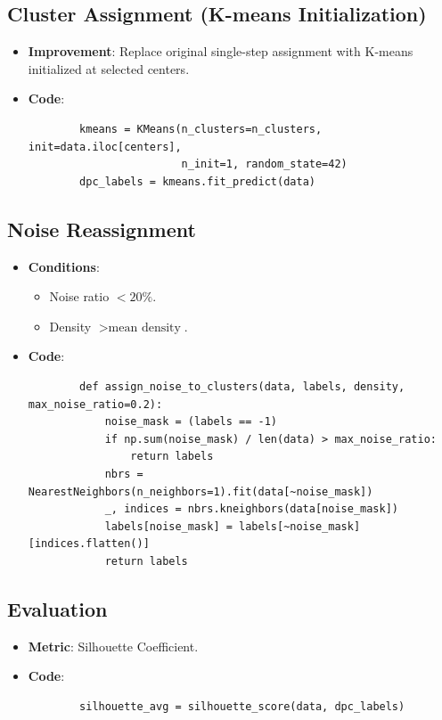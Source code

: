 \documentclass{article}
\begin{document}
\subsection{Cluster Assignment (K-means Initialization)}
\begin{itemize}
    \item \textbf{Improvement}: Replace original single-step assignment with K-means initialized at selected centers.
    \item \textbf{Code}:
    \begin{verbatim}
        kmeans = KMeans(n_clusters=n_clusters, init=data.iloc[centers], 
                        n_init=1, random_state=42)
        dpc_labels = kmeans.fit_predict(data)
    \end{verbatim}
\end{itemize}

\subsection{Noise Reassignment}
\begin{itemize}
    \item \textbf{Conditions}:
    \begin{itemize}
        \item Noise ratio \(< 20\%\).
        \item Density \(> \text{mean density}\).
    \end{itemize}
    \item \textbf{Code}:
    \begin{verbatim}
        def assign_noise_to_clusters(data, labels, density, max_noise_ratio=0.2):
            noise_mask = (labels == -1)
            if np.sum(noise_mask) / len(data) > max_noise_ratio:
                return labels
            nbrs = NearestNeighbors(n_neighbors=1).fit(data[~noise_mask])
            _, indices = nbrs.kneighbors(data[noise_mask])
            labels[noise_mask] = labels[~noise_mask][indices.flatten()]
            return labels
    \end{verbatim}
\end{itemize}

\subsection{Evaluation}
\begin{itemize}
    \item \textbf{Metric}: Silhouette Coefficient.
    \item \textbf{Code}:
    \begin{verbatim}
        silhouette_avg = silhouette_score(data, dpc_labels)
    \end{verbatim}
\end{itemize}
\end{document}
